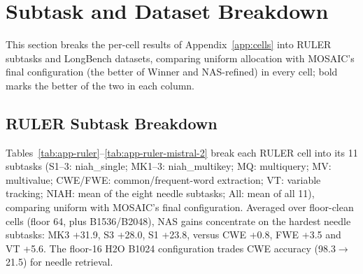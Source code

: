 \FloatBarrier
\section{Subtask and Dataset Breakdown}
\label{app:breakdown}

This section breaks the per-cell results of Appendix~\ref{app:cells} into RULER subtasks and LongBench datasets, comparing uniform allocation with MOSAIC's final configuration (the better of Winner and NAS-refined) in every cell; bold marks the better of the two in each column.


\subsection{RULER Subtask Breakdown}
\label{app:ruler}

Tables~\ref{tab:app-ruler}--\ref{tab:app-ruler-mistral-2} break each RULER cell into its 11 subtasks (S1--3: niah\_single; MK1--3: niah\_multikey; MQ: multiquery; MV: multivalue; CWE/FWE: common/frequent-word extraction; VT: variable tracking; NIAH: mean of the eight needle subtasks; All: mean of all 11), comparing uniform with MOSAIC's final configuration. Averaged over floor-clean cells (floor 64, plus B1536/B2048), NAS gains concentrate on the hardest needle subtasks: MK3 +31.9, S3 +28.0, S1 +23.8, versus CWE +0.8, FWE +3.5 and VT +5.6. The floor-16 H2O B1024 configuration trades CWE accuracy (98.3$\rightarrow$21.5) for needle retrieval.

